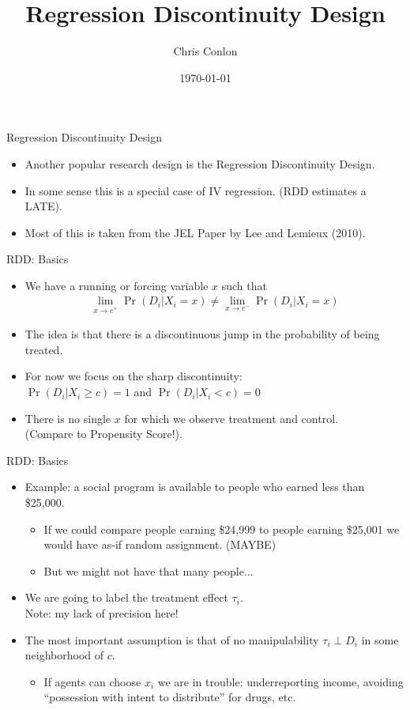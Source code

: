 \documentclass[aspectratio=169,11pt]{beamer}
\title{Regression Discontinuity Design}
\author{Chris Conlon}
\institute{Applied Econometrics}
\date{\today}
\begin{document}
\frame{\titlepage}


\begin{frame}{Regression Discontinuity Design}
\begin{itemize}
\item Another popular research design is the \alert{Regression Discontinuity Design}.
\item In some sense this is a special case of IV regression. (RDD estimates a LATE).
\item Most of this is taken from the JEL Paper by Lee and Lemieux (2010).
\end{itemize}              
\end{frame}

\begin{frame}{RDD: Basics}
\begin{itemize}
\item We have a \alert{running or forcing variable} $x$ such that 
\begin{align*}
\lim_{x\rightarrow c^{+}} \Pr(D_i | X_i = x) \neq \lim_{x\rightarrow c^{-}}\Pr(D_i | X_i = x)
\end{align*}
\item The idea is that there is a \alert{discontinuous jump} in the \alert{probability of being treated}.
\item For now we focus on the \alert{sharp discontinuity}:\\
 $\Pr(D_i | X_i \geq c) =1$ and $\Pr(D_i | X_i < c) =0$
 \item There is no single $x$ for which we observe treatment and control.\\
  (Compare to Propensity Score!).
\end{itemize}              
\end{frame}


\begin{frame}{RDD: Basics}
\begin{itemize}
\item Example: a social program is available to people who earned less than \$25,000.
\begin{itemize}              
\item If we could compare people earning \$24,999 to people earning \$25,001 we would have as-if random assignment. (MAYBE)
\item But we might not have that many people...
\end{itemize}
\item We are going to label the \alert{treatment effect} $\tau_i$.\\
Note: my lack of precision here!
\item The most important assumption is that of \alert{no manipulability} $\tau_i  \perp D_i$ in some neighborhood of $c$.
\begin{itemize}
\item If agents can \alert{choose} $x_i$ we are in trouble: underreporting income, avoiding ``possession with intent to distribute'' for drugs, etc.
\end{itemize}              
\end{itemize}              
\end{frame}
\end{document}
